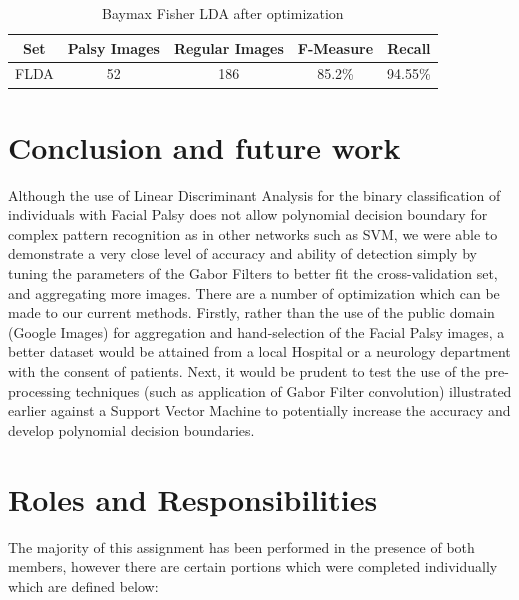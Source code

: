 \documentclass[12pt, conference]{IEEEtran}
\begin{document}
\begin{table}
\begin{center}
\caption{Baymax Fisher LDA after optimization} %
\centering %
\begin{tabular}{c c c c c } %
\hline\hline %
Set & Palsy Images & Regular Images & F-Measure & Recall \\ [0.5ex]
\hline %
FLDA & 52 & 186 & 85.2\% & 94.55\% \\ %
[1ex] %
\hline %
\end{tabular}
\label{table:metrics} %
\end{center}	
\end{table}


\break

\section{Conclusion and future work} 
Although the use of Linear Discriminant Analysis for the binary classification of individuals with Facial Palsy does not allow polynomial decision boundary for complex pattern recognition as in other networks such as SVM\cite{1}, we were able to demonstrate a very close level of accuracy and ability of detection simply by tuning the parameters of the Gabor Filters to better fit the cross-validation set, and aggregating more images. 
There are a number of optimization which can be made to our current methods. Firstly, rather than the use of the public domain (Google Images) for aggregation and hand-selection of the Facial Palsy images, a better dataset would be attained from a local Hospital or a neurology department with the consent of patients. Next, it would be prudent to test the use of the pre-processing techniques (such as application of Gabor Filter convolution) illustrated earlier against a Support Vector Machine to potentially increase the accuracy and develop polynomial decision boundaries.  

\break
\section{Roles and Responsibilities}
The majority of this assignment has been performed in the presence of both members, however there are certain portions which were completed individually which are defined below:
\end{document}
